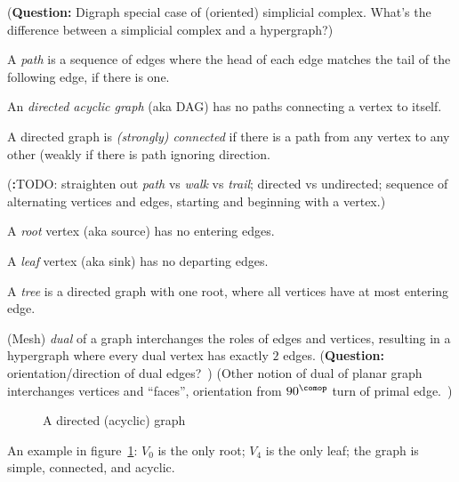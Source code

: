 \documentclass[11pt]{book}
\begin{document}
(\textbf{Question:} 
Digraph special case of (oriented) simplicial complex.
What's the difference between a simplicial complex 
and a hypergraph?)

A \textit{path} is a sequence of edges where the head of each
edge matches the tail of the following edge, if there is one.

An \textit{directed acyclic graph} (aka DAG) has no paths
connecting a vertex to itself.

A directed graph is \textit{(strongly) connected} if there is a path
from any vertex to any other (weakly if there is path
ignoring direction.

(\textbf:{TODO:} straighten out \textit{path} vs \textit{walk} vs
\textit{trail}; directed vs undirected; sequence of alternating
vertices and edges, starting and beginning with a vertex.)

A \textit{root} vertex (aka source) has no entering edges.

A \textit{leaf} vertex (aka sink) has no departing edges.

A \textit{tree} is a directed graph with one root, 
where all vertices have at most entering edge.

(Mesh) \textit{dual} of a graph interchanges the roles of edges 
and vertices, resulting in a hypergraph where every dual vertex
has exactly $2$ edges. 
(\textbf{Question:} orientation/direction of dual edges?~\cite{rusnak2012oriented})
(Other notion of dual of planar graph interchanges vertices and ``faces'',
orientation from $90^{\comop}$ turn of primal edge.~\cite{wiki_2020_dual_graph})

\begin{figure}
\centering
{}
\caption{A directed (acyclic) graph}
\label{fig:a_digraph}
\end{figure}

An example in figure~\ref{fig:a_digraph}:
$V_0$ is the only root; $V_4$ is the only leaf;
the graph is simple, connected, and acyclic.
\end{document}
